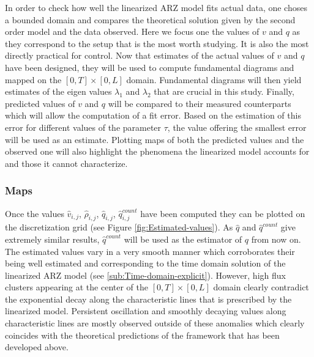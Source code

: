 \documentclass[preprint]{elsarticle}
\begin{document}
In order to check how well the linearized ARZ model fits actual data,
one choses a bounded domain and compares the theoretical solution
given by the second order model and the data observed. Here we focus
one the values of $v$ and $q$ as they correspond to the setup that
is the most worth studying. It is also the most directly practical
for control. Now that estimates of the actual values of $v$ and $q$
have been designed, they will be used to compute fundamental diagrams
and mapped on the $\left[0,T\right]\times\left[0,L\right]$ domain.
Fundamental diagrams will then yield estimates of the eigen values
$\lambda_{1}$ and $\lambda_{2}$ that are crucial in this study.
Finally, predicted values of $v$ and $q$ will be compared to their
measured counterparts which will allow the computation of a fit error.
Based on the estimation of this error for different values of the
parameter $\tau$, the value offering the smallest error will be used
as an estimate. Plotting maps of both the predicted values and the
observed one will also highlight the phenomena the linearized model
accounts for and those it cannot characterize.


\subsubsection{Maps}

Once the values $\widehat{v}_{i,j}$, $\widehat{\rho}_{i,j}$, $\widehat{q}_{i,j}$,
$\widehat{q}_{i,j}^{count}$ have been computed they can be plotted
on the discretization grid (see Figure \ref{fig:Estimated-values}).
As $\widehat{q}$ and $\widehat{q}^{count}$ give extremely similar
results, $\widehat{q}^{count}$ will be used as the estimator of $q$
from now on. The estimated values vary in a very smooth manner which
corroborates their being well estimated and corresponding to the time
domain solution of the linearized ARZ model (see \ref{sub:Time-domain-explicit}).
However, high flux clusters appearing at the center of the $\left[0,T\right]\times\left[0,L\right]$
domain clearly contradict the exponential decay along the characteristic
lines that is prescribed by the linearized model. Persistent oscillation
and smoothly decaying values along characteristic lines are mostly
observed outside of these anomalies which clearly coincides with the
theoretical predictions of the framework that has been developed above.
\end{document}

